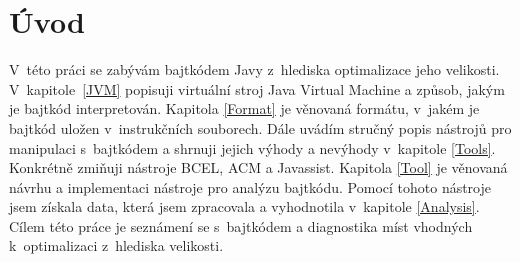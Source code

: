 \chapter{Úvod}\label{Introduction}


V~této práci se zabývám bajtkódem Javy z~hlediska optimalizace jeho velikosti. V~kapitole~\ref{JVM} popisuji virtuální stroj Java Virtual Machine a způsob, jakým je bajtkód interpretován. Kapitola \ref{Format} je věnovaná formátu, v~jakém je bajtkód uložen v~instrukčních souborech. Dále uvádím stručný popis nástrojů pro manipulaci s~bajtkódem a shrnuji jejich výhody a nevýhody v~kapitole \ref{Tools}. Konkrétně zmiňuji nástroje BCEL, ACM a Javassist. Kapitola \ref{Tool} je věnovaná návrhu a implementaci nástroje pro analýzu bajtkódu. Pomocí tohoto nástroje jsem získala data, která jsem zpracovala a vyhodnotila v~kapitole \ref{Analysis}. Cílem této práce je seznámení se s~bajtkódem a diagnostika míst vhodných k~optimalizaci z~hlediska velikosti.


